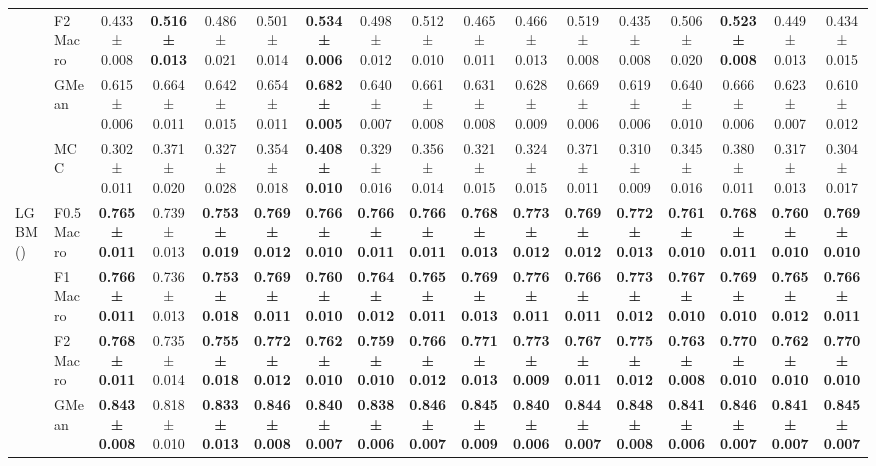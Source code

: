 \begin{table}[H]
{\begin{tabular}{llccccccccccccccc}
 & F2 Macro & 0.433 ± 0.008 & \textbf{0.516 ± 0.013} & 0.486 ± 0.021 & 0.501 ± 0.014 & \textbf{0.534 ± 0.006} & 0.498 ± 0.012 & 0.512 ± 0.010 & 0.465 ± 0.011 & 0.466 ± 0.013 & 0.519 ± 0.008 & 0.435 ± 0.008 & 0.506 ± 0.020 & \textbf{0.523 ± 0.008} & 0.449 ± 0.013 & 0.434 ± 0.015 \\
 & GMean & 0.615 ± 0.006 & 0.664 ± 0.011 & 0.642 ± 0.015 & 0.654 ± 0.011 & \textbf{0.682 ± 0.005} & 0.640 ± 0.007 & 0.661 ± 0.008 & 0.631 ± 0.008 & 0.628 ± 0.009 & 0.669 ± 0.006 & 0.619 ± 0.006 & 0.640 ± 0.010 & 0.666 ± 0.006 & 0.623 ± 0.007 & 0.610 ± 0.012 \\
 & MCC & 0.302 ± 0.011 & 0.371 ± 0.020 & 0.327 ± 0.028 & 0.354 ± 0.018 & \textbf{0.408 ± 0.010} & 0.329 ± 0.016 & 0.356 ± 0.014 & 0.321 ± 0.015 & 0.324 ± 0.015 & 0.371 ± 0.011 & 0.310 ± 0.009 & 0.345 ± 0.016 & 0.380 ± 0.011 & 0.317 ± 0.013 & 0.304 ± 0.017 \\
\cline{1-17}
\multirow[t]{5}{*}{LGBM()} & F0.5 Macro & \textbf{0.765 ± 0.011} & 0.739 ± 0.013 & \textbf{0.753 ± 0.019} & \textbf{0.769 ± 0.012} & \textbf{0.766 ± 0.010} & \textbf{0.766 ± 0.011} & \textbf{0.766 ± 0.011} & \textbf{0.768 ± 0.013} & \textbf{0.773 ± 0.012} & \textbf{0.769 ± 0.012} & \textbf{0.772 ± 0.013} & \textbf{0.761 ± 0.010} & \textbf{0.768 ± 0.011} & \textbf{0.760 ± 0.010} & \textbf{0.769 ± 0.010} \\
 & F1 Macro & \textbf{0.766 ± 0.011} & 0.736 ± 0.013 & \textbf{0.753 ± 0.018} & \textbf{0.769 ± 0.011} & \textbf{0.760 ± 0.010} & \textbf{0.764 ± 0.012} & \textbf{0.765 ± 0.011} & \textbf{0.769 ± 0.013} & \textbf{0.776 ± 0.011} & \textbf{0.766 ± 0.011} & \textbf{0.773 ± 0.012} & \textbf{0.767 ± 0.010} & \textbf{0.769 ± 0.010} & \textbf{0.765 ± 0.012} & \textbf{0.766 ± 0.011} \\
 & F2 Macro & \textbf{0.768 ± 0.011} & 0.735 ± 0.014 & \textbf{0.755 ± 0.018} & \textbf{0.772 ± 0.012} & \textbf{0.762 ± 0.010} & \textbf{0.759 ± 0.010} & \textbf{0.766 ± 0.012} & \textbf{0.771 ± 0.013} & \textbf{0.773 ± 0.009} & \textbf{0.767 ± 0.011} & \textbf{0.775 ± 0.012} & \textbf{0.763 ± 0.008} & \textbf{0.770 ± 0.010} & \textbf{0.762 ± 0.010} & \textbf{0.770 ± 0.010} \\
 & GMean & \textbf{0.843 ± 0.008} & 0.818 ± 0.010 & \textbf{0.833 ± 0.013} & \textbf{0.846 ± 0.008} & \textbf{0.840 ± 0.007} & \textbf{0.838 ± 0.006} & \textbf{0.846 ± 0.007} & \textbf{0.845 ± 0.009} & \textbf{0.840 ± 0.006} & \textbf{0.844 ± 0.007} & \textbf{0.848 ± 0.008} & \textbf{0.841 ± 0.006} & \textbf{0.846 ± 0.007} & \textbf{0.841 ± 0.007} & \textbf{0.845 ± 0.007} \\

\end{tabular}}
\end{table}

